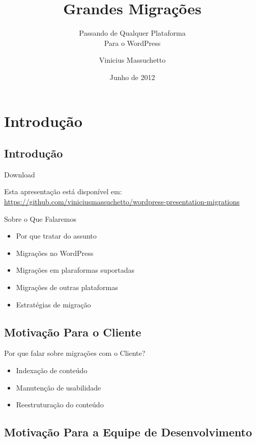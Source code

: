 \documentclass[handout]{beamer}
\title{Grandes Migrações}
\subtitle{Passando de Qualquer Plataforma \\
  Para o WordPress}
\author{Vinicius Massuchetto}
\institute{WordCamp Curitiba 2012}
\date{Junho de 2012}
\begin{document}
\frame{\titlepage}

\section{Introdução}

\subsection{Introdução}

\begin{frame}{Download}
  \begin{center}
    Esta apresentação está disponível em: \\
    \url{https://github.com/viniciusmassuchetto/wordpress-presentation-migrations}
  \end{center}
\end{frame}

\begin{frame}{Sobre o Que Falaremos}
\begin{itemize}
  \item Por que tratar do assunto
  \item Migrações no WordPress
  \item Migrações em plaraformas suportadas
  \item Migrações de outras plataformas
  \item Estratégias de migração
\end{itemize}
\end{frame}


\subsection{Motivação Para o Cliente}

\begin{frame}{Por que falar sobre migrações com o Cliente?}
\begin{itemize}
  \pause \item Indexação de conteúdo
  \pause \item Manutenção de usabilidade
  \pause \item Reestruturação do conteúdo
\end{itemize}
\end{frame}

\subsection{Motivação Para a Equipe de Desenvolvimento}
\end{document}
